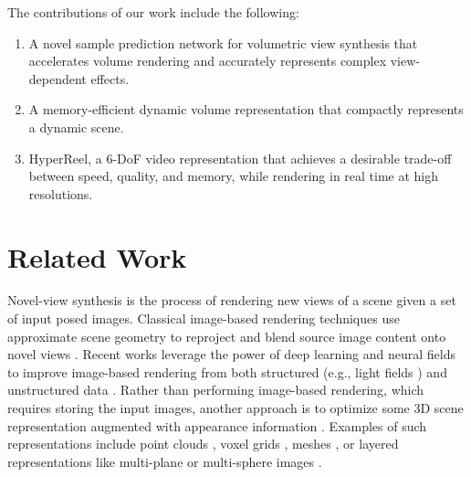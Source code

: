 \documentclass[10pt,twocolumn,letterpaper]{article}
\makeatletter
\renewcommand\paragraph{\@startsection{paragraph}{4}{\z@}{0.75ex \@plus.5ex \@minus.2ex}{-1em}{\normalfont\normalsize\bfseries\maybe@addperiod}}
\newcommand{\maybe@addperiod}[1]{#1\@addpunct{.}}
\makeatother
\begin{document}
The contributions of our work include the following:
\begin{enumerate}\itemsep0em
    \item
    A novel sample prediction network for volumetric view synthesis that accelerates volume rendering and accurately represents complex view-dependent effects.

    \item
    A memory-efficient dynamic volume representation that compactly represents a dynamic scene.
    
    \item
    HyperReel, a 6-DoF video representation that achieves a desirable trade-off between speed, quality, and memory, while rendering in real time at high resolutions.
\end{enumerate}
 \section{Related Work}
\label{sec:relatedwork}

\paragraph{Novel View Synthesis} 
Novel-view synthesis is the process of rendering new views of a scene given a set of input posed images.
Classical image-based rendering techniques use approximate scene geometry to reproject and blend source image content onto novel views \cite{BuehlBMGC2001,ShumCK2007,PenneZ2017}.
Recent works leverage the power of deep learning and neural fields \cite{XieTSLYKTTSS2022} to improve image-based rendering from both structured (e.g., light fields \cite{GortlGSC1996, LevoyH1996}) and unstructured data \cite{BemanMSR2020, SuhaiESM2022}.
Rather than performing image-based rendering, which requires storing the input images, another approach is to optimize some 3D scene representation augmented with appearance information \cite{RichaTW2020}.
Examples of such representations include point clouds \cite{AlievSKUL2020, RakhiALB2022}, voxel grids \cite{LombaSSSLS2019, NguyeLTRY2019, SitzmTHNWZ2019}, meshes \cite{RieglK2020, RieglK2021}, or layered representations like multi-plane \cite{ZhouTFFS2018, MildeSOKRNK2019, FlynnBDDFOST2019} or multi-sphere images \cite{AttalLGRT2020, BroxtFOEHDDBWD2020}.
\end{document}
